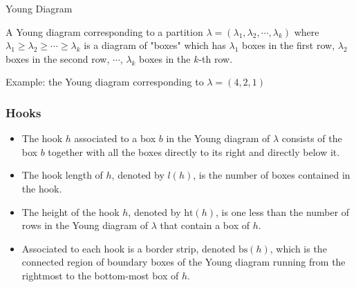 \documentclass{beamer}
\begin{document}
\begin{frame}{Young Diagram}
    \begin{definition}
        A Young diagram corresponding to a partition $\lambda = (\lambda_1, \lambda_2, \cdots, \lambda_k)$ where $\lambda_1 \geq \lambda_2 \geq  \cdots \geq \lambda_k$ is a diagram of "boxes" which has $\lambda_1$ boxes in the first row, $\lambda_2$ boxes in the second row, $\cdots$, $\lambda_k$ boxes in the $k$-th row.
    \end{definition}
    Example: the Young diagram corresponding to $\lambda = (4,2,1)$\\
    \centering
{}

\end{frame}


\begin{frame}
\frametitle{Hooks}
\begin{itemize}
    \item The hook $h$ associated to a box $b$ in the Young diagram of $\lambda$ consists of the box $b$ together with all the boxes directly to its right and directly below it. 
    \item The hook length of $h$, denoted by $l(h)$, is the number of boxes contained in the hook. 
    \item The height of the hook $h$, denoted by $\text{ht}(h)$, is one less than the number of rows in the Young diagram of $\lambda$ that contain a box of $h$. 
    \item  Associated to each hook is a border strip, denoted $\text{bs}(h)$, which is the connected region of boundary boxes of the Young diagram running from the rightmost to the bottom-most box of $h$.
\end{itemize}
\centering
{}
\label{fig:younghl}
\end{frame}
\end{document}
